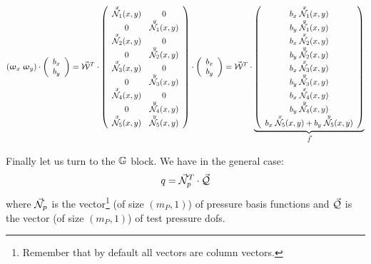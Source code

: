 \[
(\upomega_x \; \upomega_y) \cdot 
\left(
\begin{array}{c}
b_x \\ b_y
\end{array}
\right)
= 
\vec{\cal W}^T \cdot 
\left(
\begin{array}{cc}
\overset{\tiny x}{{\mathcal{N}}_1}(x,y) & 0 \\
0 & \overset{\tiny y}{{\mathcal{N}}_1}(x,y) \\
\overset{\tiny x}{{\mathcal{N}}_2}(x,y) & 0 \\
0 & \overset{\tiny y}{{\mathcal{N}}_2}(x,y) \\
\overset{\tiny x}{{\mathcal{N}}_3}(x,y) & 0 \\
0 & \overset{\tiny y}{{\mathcal{N}}_3}(x,y) \\
\overset{\tiny x}{{\mathcal{N}}_4}(x,y) & 0 \\
0 & \overset{\tiny y}{{\mathcal{N}}_4}(x,y) \\
\overset{\tiny x}{{\mathcal{N}}_5}(x,y)  & \overset{\tiny y}{{\mathcal{N}}_5}(x,y) 
\end{array}
\right)
\cdot
\left(
\begin{array}{c}
b_x \\ b_y
\end{array}
\right)
=
\vec{\cal W}^T \cdot 
\underbrace{
\left(
\begin{array}{c}
b_x\; \overset{\tiny x}{{\mathcal{N}}_1}(x,y) \\
b_y\; \overset{\tiny y}{{\mathcal{N}}_1}(x,y) \\
b_x\; \overset{\tiny x}{{\mathcal{N}}_2}(x,y) \\
b_y\; \overset{\tiny y}{{\mathcal{N}}_2}(x,y) \\
b_x\; \overset{\tiny x}{{\mathcal{N}}_3}(x,y) \\
b_y\; \overset{\tiny y}{{\mathcal{N}}_3}(x,y) \\
b_x\; \overset{\tiny x}{{\mathcal{N}}_4}(x,y) \\
b_y\; \overset{\tiny y}{{\mathcal{N}}_4}(x,y) \\
b_x\; \overset{\tiny x}{{\mathcal{N}}_5}(x,y) +b_y\; \overset{\tiny y}{{\mathcal{N}}_5}(x,y) 
\end{array}
\right)
}_{\vec{f}}
\]

Finally let us turn to the ${\mathbb{G}}$ block.
We have in the general case:
\[
q = \vec{{\mathcal{N}}}_p^T \cdot \vec{\cal Q}
\]
where $\vec{{\mathcal{N}}}_p$ is the vector\footnote{Remember that by 
default all vectors are column vectors.} (of size $(m_P,1)$) 
of pressure basis functions
and $\vec{\cal Q}$ is the vector (of size $(m_P,1)$) of test pressure dofs.


